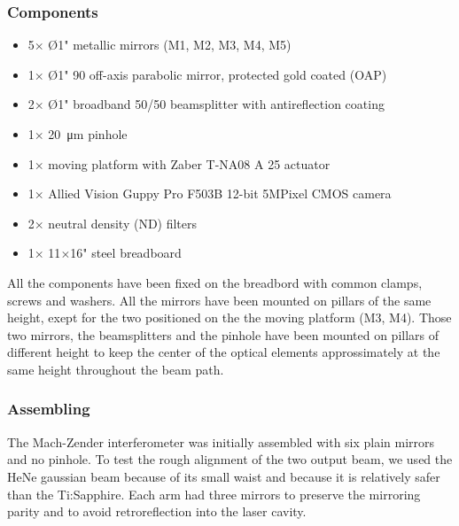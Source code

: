 \documentclass[12pt,a4paper,twoside]{article}
\begin{document}

\clearpage
\subsubsection*{Components}
\begin{itemize}
	\item 5$\times$ Ø1" metallic mirrors (M1, M2, M3, M4, M5)
	\item 1$\times$ Ø1" 90 off-axis parabolic mirror, protected gold coated (OAP)
	\item 2$\times$ Ø1" broadband 50/50 beamsplitter with antireflection coating
	\item 1$\times$ \SI{20}{\um} pinhole
	\item 1$\times$ moving platform with Zaber T-NA08 A 25 actuator
	\item 1$\times$ Allied Vision Guppy Pro F503B 12-bit 5MPixel CMOS camera
	\item 2$\times$ neutral density (ND) filters
	\item 1$\times$ 11$\times$16" steel breadboard
\end{itemize}
All the components have been fixed on the breadbord with common clamps, screws and washers.
All the mirrors have been mounted on pillars of the same height, exept for the two positioned on the the moving platform (M3, M4).
Those two mirrors, the beamsplitters and the pinhole have been mounted on pillars of different height to keep the center of the optical elements approssimately at the same height throughout the beam path.

\subsubsection{Assembling}
The Mach-Zender interferometer was initially assembled with six plain mirrors and no pinhole.
To test the rough alignment of the two output beam, we used the HeNe gaussian beam because of its small waist and because it is relatively safer than the Ti:Sapphire.
Each arm had three mirrors to preserve the mirroring parity and to avoid retroreflection into the laser cavity.
\end{document}
